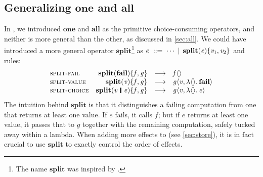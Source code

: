\documentclass[acmsmall]{acmart}
\newcommand{\Varid}[1]{\mathit{#1}}
\begin{document}
\subsection{Generalizing \texorpdfstring{\ensuremath{\textbf{one}}}{``one''} and \texorpdfstring{\ensuremath{\textbf{all}}}{``all''}} \label{sec:split}

In \versecalc{}, we introduced \ensuremath{\textbf{one}} and \ensuremath{\textbf{all}} as the primitive choice-consuming operators, and neither is more general than the other, as discussed in \cref{sec:all}.
We could have introduced a more general operator \ensuremath{\textbf{split}}\footnote{The name \ensuremath{\textbf{split}} was inspired by \citet{oleglogict}.} as $e \; ::= \; \cdots \vb \ensuremath{\textbf{split}(\Varid{e})\{\Varid{v}_{\mathrm{1}},\Varid{v}_{\mathrm{2}}\}}$ and rules:
\[\begin{array}{lrcll}
    \rulename{split-fail} & \ensuremath{\textbf{split}(\textbf{fail})\{\Varid{f},\Varid{g}\}} & \movesto & \ensuremath{\Varid{f}\langle\rangle} \\
    \rulename{split-value} & \ensuremath{\textbf{split}(\Varid{v})\{\Varid{f},\Varid{g}\}} & \movesto & \ensuremath{\Varid{g}\langle\Varid{v},\lambda \langle\rangle.\,\textbf{fail}\rangle}  \\
    \rulename{split-choice} & \ensuremath{\textbf{split}(\Varid{v}\hspace{0.2em}\mathop{\rule[-0.1em]{0.15em}{0.75em}}\hspace{0.2em}\Varid{e})\{\Varid{f},\Varid{g}\}} & \movesto & \ensuremath{\Varid{g}\langle\Varid{v},\lambda \langle\rangle.\,\Varid{e}\rangle}  \\
\end{array}\]
The intuition behind \ensuremath{\textbf{split}} is that it distinguishes a failing computation from one that returns at least one value.
If \ensuremath{\Varid{e}} fails, it calls \ensuremath{\Varid{f}}; but if \ensuremath{\Varid{e}} returns at least one value, it passes that to \ensuremath{\Varid{g}} together with the remaining computation, safely tucked away within a lambda.
When adding more effects to \versecalc{} (see \cref{sec:store}), it is in fact crucial to use $\ensuremath{\textbf{split}}$ to exactly control the order of effects.
\end{document}
